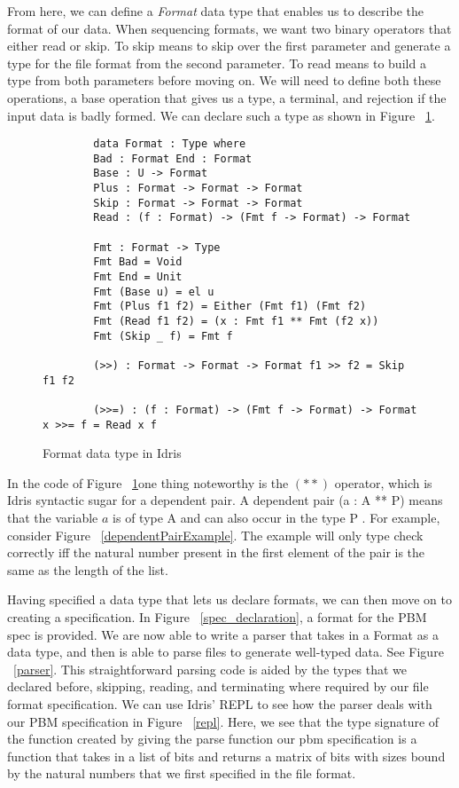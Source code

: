 From here, we can define a \textit{Format} data type that enables us to describe
the format of our data. When sequencing formats, we want two binary operators
that either read or skip. To skip means to skip over the first parameter and
generate a type for the file format from the second parameter. To read means to
build a type from both parameters before moving on. We will need to define both
these operations, a base operation that gives us a type, a terminal, and
rejection if the input data is badly formed. We can declare such a type as
shown in Figure ~\ref{formatDeclaration}.

\begin{figure}[ht!!!!!!]
    \caption{Format data type in Idris \protect\cite{power_of_pi}}
    \label{formatDeclaration}
    \begin{lstlisting}
        data Format : Type where 
        Bad : Format End : Format 
        Base : U -> Format
        Plus : Format -> Format -> Format 
        Skip : Format -> Format -> Format 
        Read : (f : Format) -> (Fmt f -> Format) -> Format

        Fmt : Format -> Type 
        Fmt Bad = Void 
        Fmt End = Unit 
        Fmt (Base u) = el u
        Fmt (Plus f1 f2) = Either (Fmt f1) (Fmt f2) 
        Fmt (Read f1 f2) = (x : Fmt f1 ** Fmt (f2 x)) 
        Fmt (Skip _ f) = Fmt f

        (>>) : Format -> Format -> Format f1 >> f2 = Skip f1 f2

        (>>=) : (f : Format) -> (Fmt f -> Format) -> Format x >>= f = Read x f
    \end{lstlisting}
\end{figure}

In the code of Figure ~\ref{formatDeclaration}\footnotemark[\ref{idris_source}]
one thing noteworthy is the $(**)$ operator, which is Idris syntactic sugar for
a dependent pair. A dependent pair (a : A ** P) means that the variable $a$
is of type A and can also occur in the type P \cite{tdd_book}. For example,
consider Figure ~\ref{dependentPairExample}. The example will only type check
correctly iff the natural number present in the first element of the pair is the
same as the length of the list. 

Having specified a data type that lets us declare formats, we can then move on
to creating a specification. In Figure
~\ref{spec_declaration}\footnotemark[\ref{idris_source}], a format for the PBM
spec is provided. We are now able to write a parser that takes in a Format as a
data type, and then is able to parse files to generate well-typed data. See
Figure ~\ref{parser}\footnotemark[\ref{idris_source}]. This straightforward
parsing code is aided by the types that we declared before, skipping, reading,
and terminating where required by our file format specification. We can use
Idris' REPL to see how the parser deals with our PBM specification in Figure
~\ref{repl}\footnotemark[\ref{idris_source}]. Here, we see that the type
signature of the function created by giving the parse function our pbm
specification is a function that takes in a list of bits and returns a matrix of
bits with sizes bound by the natural numbers that we first specified in the file
format. 

